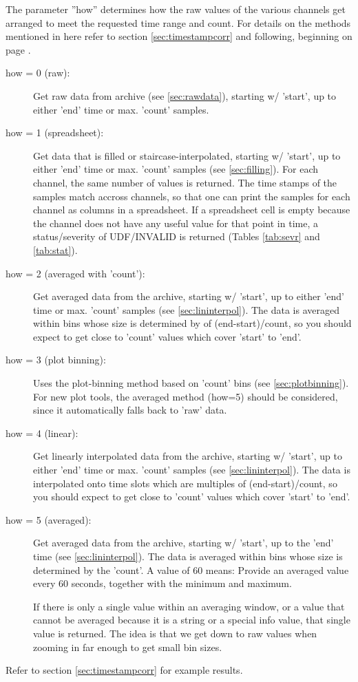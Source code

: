 \noindent The parameter ''how'' determines how the raw values of the
various channels get arranged to meet the requested time range and
count.  For details on the methods mentioned in here refer to section
\ref{sec:timestampcorr} and following, beginning on page
\pageref{sec:timestampcorr}.
\begin{description}
\item[\sffamily how = 0 (raw):]
  Get raw data from archive (see \ref{sec:rawdata}), starting w/ 'start',
  up to either 'end' time or max. 'count' samples.
\item[\sffamily how = 1 (spreadsheet):]
  Get data that is filled or staircase-interpolated, starting
  w/ 'start', up to either 'end' time or max. 'count' samples
  (see \ref{sec:filling}).
  For each channel, the same number of values is returned. The
  time stamps of the samples match accross channels, so that one can
  print the samples for each channel as columns in a spreadsheet.
  If a spreadsheet cell is empty because the channel does not have any
  useful value for that point in time, a status/severity of
  UDF/INVALID is returned (Tables \ref{tab:sevr} and \ref{tab:stat}).
\item[\sffamily how = 2 (averaged with 'count'):]
  Get averaged data from the archive, starting w/ 'start',
  up to either 'end' time or max. 'count' samples
  (see \ref{sec:lininterpol}).
  The data is averaged within bins whose size is determined by 
  of (end-start)/count, so you should expect to get close to 'count'
  values which cover 'start' to 'end'.
\item[\sffamily how = 3 (plot binning):]
  Uses the plot-binning method based on 'count' bins
  (see \ref{sec:plotbinning}).
  For new plot tools, the averaged method (how=5) should be considered,
  since it automatically falls back to 'raw' data.
\item[\sffamily how = 4 (linear):]
  Get linearly interpolated data from the archive, starting w/ 'start',
  up to either 'end' time or max. 'count' samples
  (see \ref{sec:lininterpol}).
  The data is interpolated onto time slots which are multiples
  of (end-start)/count, so you should expect to get close to 'count'
  values which cover 'start' to 'end'.
\item[\sffamily how = 5 (averaged):]
  Get averaged data from the archive, starting w/ 'start',
  up to the 'end' time (see \ref{sec:lininterpol}).
  The data is averaged within bins whose size is determined by 
  the 'count'. A value of 60 means: Provide an averaged value every 60 seconds,
  together with the minimum and maximum.
  
  If there is only a single value within an averaging window, or a value
  that cannot be averaged because it is a string or a special info value,
  that single value is returned.
  The idea is that we get down to raw values when zooming in far enough to
  get small bin sizes.
\end{description}
Refer to section \ref{sec:timestampcorr} for example results.

